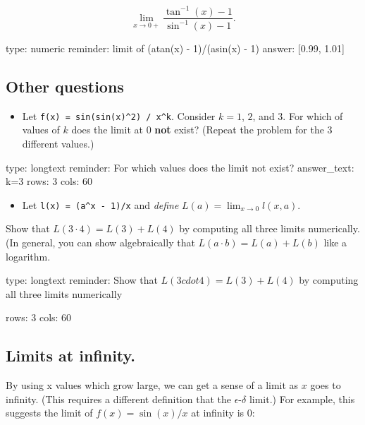 \documentclass[12pt]{article}
\begin{document}
\[
\lim_{x \rightarrow 0+} \frac{\tan^{-1}(x) - 1}{\sin^{-1}(x) - 1}.
\]

\begin{answer}
    type: numeric
    reminder: limit of   (atan(x) - 1)/(asin(x) - 1)
    answer: [0.99, 1.01]

\end{answer}

\subsection{Other questions}

\begin{itemize}
\itemsep1pt\parskip0pt
\item
  Let \texttt{f(x) = sin(sin(x)\^{}2) / x\^{}k}. Consider $k=1$, $2$,
  and $3$. For which of values of $k$ does the limit at $0$ \textbf{not}
  exist? (Repeat the problem for the 3 different values.)
\end{itemize}

\begin{answer}
type: longtext
reminder: For which values does the limit not exist?
answer_text: k=3 
rows: 3
cols: 60
\end{answer}

\begin{itemize}
\itemsep1pt\parskip0pt
\item
  Let \texttt{l(x) = (a\^{}x - 1)/x} and \emph{define}
  $L(a) = \lim_{x\rightarrow 0} l(x,a)$.
\end{itemize}

Show that $L(3 \cdot 4) = L(3) + L(4)$ by computing all three limits
numerically. (In general, you can show algebraically that
$L(a\cdot b) = L(a) + L(b)$ like a logarithm.

\begin{answer}
type: longtext
reminder: Show that \( L(3 cdot 4) = L(3) + L(4) \) by computing all three limits numerically

rows: 3
cols: 60
\end{answer}

\subsection{Limits at infinity.}

By using x values which grow large, we can get a sense of a limit as $x$
goes to infinity. (This requires a different definition that the
$\epsilon$-$\delta$ limit.) For example, this suggests the limit of
$f(x) = \sin(x)/x$ at infinity is $0$:
\end{document}

